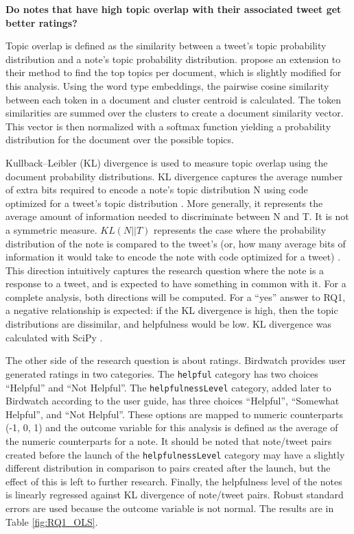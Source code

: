 \documentclass [11pt, proquest] {uwthesis}[2020/02/24]
\begin{document}
\textbf{Do notes that have high topic overlap with their associated tweet get better ratings?
}


Topic overlap is defined as the similarity between a tweet’s topic probability distribution and a note’s topic probability distribution. \cite{sia-etal-2020-tired} propose an extension to their method to find the top topics per document, which is slightly modified for this analysis. Using the word type embeddings,  the pairwise cosine similarity between each token in a document and cluster centroid is calculated. The token similarities are summed over the clusters to create a document similarity vector. This vector is then normalized with a softmax function yielding a probability distribution for the document over the possible topics.

Kullback–Leibler (KL) divergence is used to measure topic overlap using the document probability distributions. KL divergence captures the average number of extra bits required to encode a note’s topic distribution N using code optimized for a tweet’s topic distribution \citep{Murphy2012}. More generally, it represents the average amount of information needed to discriminate between N and T. It is not a symmetric measure. $KL(N || T)$ represents the case where the probability distribution of the note is compared to the tweet’s (or, how many average bits of information it would take to encode the note with code optimized for a tweet) . This direction intuitively captures the research question where the note is a response to a tweet, and is expected to have something in common with it. For a complete analysis, both directions will be computed. For a “yes” answer to RQ1, a negative relationship is expected: if the KL divergence is high, then the topic distributions are dissimilar, and helpfulness would be low. KL divergence was calculated with SciPy \citep{2020SciPy-NMeth}.

The other side of the research question is about ratings. Birdwatch provides user generated ratings in two categories. The \verb|helpful| category has two choices “Helpful” and “Not Helpful”. The \verb|helpfulnessLevel| category, added later to Birdwatch according to the user guide, has three choices “Helpful”, “Somewhat Helpful”, and “Not Helpful”. These options are mapped to numeric counterparts (-1, 0, 1) and the outcome variable for this analysis is defined as the average of the numeric counterparts for a note. It should be noted that note/tweet pairs created before the launch of the \verb|helpfulnessLevel| category may have a slightly different distribution in comparison to pairs created after the launch, but the effect of this is left to further research.
Finally, the helpfulness level of the notes  is linearly regressed against KL divergence of note/tweet pairs. Robust standard errors are used because the outcome variable is not normal.
The results are in Table \ref{fig:RQ1_OLS}.
\end{document}

